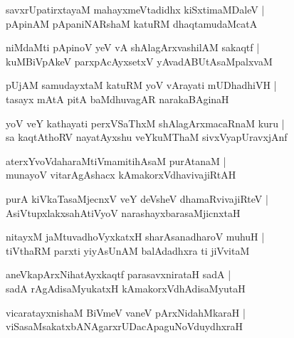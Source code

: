 \documentclass[twoside,12pt,openright]{book}
\newcounter{shloka}[chapter]
\begin{document}
\begin{shloka}%
savxrUpatirxtayaM mahayxmeVtadidhx kiSxtimaMDaleV |\\
pApinAM pApaniNARshaM katuRM dhaqtamudaMcatA 
\end{shloka}

\begin{shloka}%
niMdaMti pApinoV yeV vA shAlagArxvashilAM sakaqtf |\\
kuMBiVpAkeV parxpAcAyxsetxV yAvadABUtAsaMpalxvaM 
\end{shloka}

\begin{shloka}%
pUjAM samudayxtaM katuRM yoV vArayati mUDhadhiVH |\\
tasayx mAtA pitA baMdhuvagAR narakaBAginaH
\end{shloka}

\begin{shloka}%
yoV veY kathayati perxVSaThxM shAlagArxmacaRnaM kuru |\\
sa kaqtAthoRV nayatAyxshu veYkuMThaM sivxVyapUravxjAnf 
\end{shloka}

\begin{shloka}%
aterxYvoVdaharaMtiVmamitihAsaM purAtanaM |\\
munayoV vitarAgAshacx kAmakorxVdhavivajiRtAH 
\end{shloka}

\begin{shloka}%
purA kiVkaTasaMjecnxV veY deVsheV dhamaRvivajiRteV |\\
AsiVtupxlakxsahAtiVyoV narashayxbarasaMjicnxtaH 
\end{shloka}

\begin{shloka}%
nitayxM jaMtuvadhoVyxkatxH sharAsanadharoV muhuH |\\
tiVthaRM parxti yiyAsUnAM balAdadhxra ti jiVvitaM 
\end{shloka}

\begin{shloka}%
aneVkapArxNihatAyxkaqtf parasavxnirataH sadA |\\
sadA rAgAdisaMyukatxH kAmakorxVdhAdisaMyutaH 
\end{shloka}

\begin{shloka}%
vicaratayxnishaM BiVmeV vaneV pArxNidahMkaraH |\\
viSasaMsakatxbANAgarxrUDacApaguNoVduydhxraH 
\end{shloka}
\end{document}
